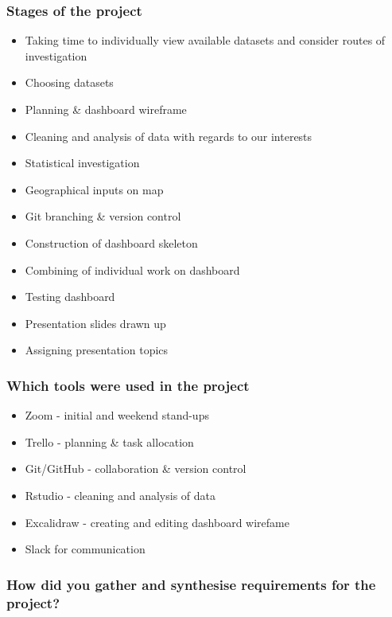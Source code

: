 \documentclass[
]{article}
\providecommand{\tightlist}{%
  \setlength{\itemsep}{0pt}\setlength{\parskip}{0pt}}
\begin{document}
\hypertarget{stages-of-the-project}{%
\subsubsection{Stages of the project}\label{stages-of-the-project}}

\begin{itemize}
\tightlist
\item
  Taking time to individually view available datasets and consider
  routes of investigation
\item
  Choosing datasets
\item
  Planning \& dashboard wireframe
\item
  Cleaning and analysis of data with regards to our interests
\item
  Statistical investigation
\item
  Geographical inputs on map
\item
  Git branching \& version control
\item
  Construction of dashboard skeleton
\item
  Combining of individual work on dashboard
\item
  Testing dashboard
\item
  Presentation slides drawn up
\item
  Assigning presentation topics
\end{itemize}

\hypertarget{which-tools-were-used-in-the-project}{%
\subsubsection{Which tools were used in the
project}\label{which-tools-were-used-in-the-project}}

\begin{itemize}
\tightlist
\item
  Zoom - initial and weekend stand-ups
\item
  Trello - planning \& task allocation
\item
  Git/GitHub - collaboration \& version control
\item
  Rstudio - cleaning and analysis of data
\item
  Excalidraw - creating and editing dashboard wirefame
\item
  Slack for communication
\end{itemize}

\hypertarget{how-did-you-gather-and-synthesise-requirements-for-the-project}{%
\subsubsection{How did you gather and synthesise requirements for the
project?}\label{how-did-you-gather-and-synthesise-requirements-for-the-project}}
\end{document}
